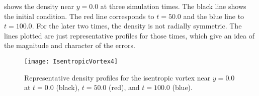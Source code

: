  shows the density near $y=0.0$ at three simulation
times. The black line shows the initial condition. The red line
corresponds to $t=50.0$ and the blue line to $t=100.0$. For the
later two times, the density is not radially symmetric. The lines
plotted are just representative profiles for those times, which give
an idea of the magnitude and character of the errors.
\begin{figure}
\begin{center}
{\leavevmode\texttt{[image: IsentropicVortex4]}}
\end{center}
\caption{\label{Fig:iv4} Representative density profiles for the isentropic
vortex near $y=0.0$ at $t=0.0$ (black), $t=50.0$ (red), and $t=100.0$ (blue).}
\end{figure}

%

